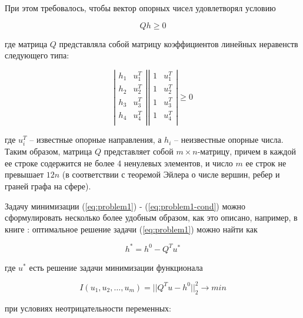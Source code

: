 \documentclass[a4paper, 12pt, titlepage]{article}
\theoremstyle{definition}
\theoremstyle{plain}
\theoremstyle{plain}
\begin{document}
При этом требовалось, чтобы вектор опорных чисел удовлетворял условию

\begin{equation}
\label{eq:problem1-cond}
 Q h \geq 0
\end{equation}

где матрица $Q$ представляла собой матрицу коэффициентов линейных неравенств
следующего типа:

\begin{equation}
\left|\begin{array}{cc}
  h_{1} & u_{1}^{T} \\
  h_{2} & u_{2}^{T} \\
  h_{3} & u_{3}^{T} \\
  h_{4} & u_{4}^{T} \\
\end{array}\right|
  \left|\begin{array}{cc}
  1 & u_{1}^{T} \\
  1 & u_{2}^{T} \\
  1 & u_{3}^{T} \\
  1 & u_{4}^{T} \\
\end{array}\right|
\geq 0
\end{equation}

где $u_{i}^{T}$ -- известные опорные направления, а $h_{i}$ -- неизвестные
опорные числа. Таким образом, матрица $Q$ представляет собой $m \times
n$-матрицу, причем в каждой ее строке содержится не более 4 ненулевых элементов,
и число $m$ ее строк не превышает $12 n$ (в соответствии с теоремой Эйлера о
числе вершин, ребер и граней графа на сфере).

Задачу минимизации (\ref{eq:problem1}) - (\ref{eq:problem1-cond}) можно
сформулировать несколько более удобным образом, как это описано, например, в
книге \cite{BertsekasTsitsiklis1989}: оптимальное решение задачи
(\ref{eq:problem1}) можно найти как

\begin{equation}
\label{eq:problem2}
 h^{*} = h^{0} - Q^{T} u^{*}
\end{equation}

где $u^{*}$ есть решение задачи минимизации функционала

\begin{equation}
\label{eq:problem2-cond}
 I(u_{1}, u_{2}, \ldots, u_{m}) = ||Q^{T} u - h^{0}||_{2}^{2} \to min
\end{equation}

при условиях неотрицательности переменных:
\end{document}
